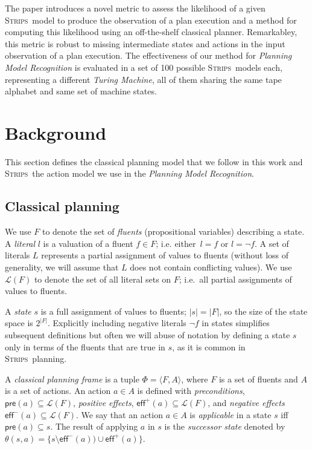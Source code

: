 \documentclass[letterpaper]{article} %
\newcommand{\tup}[1]{{\langle #1 \rangle}}
\newcommand{\pre}{\mathsf{pre}}     %
\newcommand{\eff}{\mathsf{eff}}     %
\newcommand{\strips}{\textsc{Strips}}     %
\begin{document}
The paper introduces a novel metric to assess the likelihood of a given \strips\ model to produce the observation of a plan execution and a method for computing this likelihood using an off-the-shelf classical planner. Remarkabley, this metric is robust to missing intermediate states and actions in the input observation of a plan execution. The effectiveness of our method for {\em Planning Model Recognition} is evaluated in a set of 100 possible \strips\ models each, representing a different {\em Turing Machine}, all of them sharing the same tape alphabet and same set of machine states.


\section{Background}
\label{sec:section2}
This section defines the classical planning model that we follow in this work and \strips\, the action model we use in the {\em Planning Model Recognition}.

\subsection{Classical planning}
We use $F$ to denote the set of {\em fluents} (propositional variables) describing a state. A {\em literal} $l$ is a valuation of a fluent $f\in F$; i.e. either~$l=f$ or $l=\neg f$. A set of literals $L$ represents a partial assignment of values to fluents (without loss of generality, we will assume that $L$ does not contain conflicting values). We use $\mathcal{L}(F)$ to denote the set of all literal sets on $F$; i.e.~all partial assignments of values to fluents.

A {\em state} $s$ is a full assignment of values to fluents; $|s|=|F|$, so the size of the state space is $2^{|F|}$. Explicitly including negative literals $\neg f$ in states simplifies subsequent definitions but often we will abuse of notation by defining a state $s$ only in terms of the fluents that are true in $s$, as it is common in \strips\ planning.

A {\em classical planning frame} is a tuple $\Phi=\tup{F,A}$, where $F$ is a set of fluents and $A$ is a set of actions. An action $a\in A$ is defined with {\em preconditions}, $\pre(a)\subseteq\mathcal{L}(F)$, {\em positive effects}, $\eff^+(a)\subseteq\mathcal{L}(F)$, and {\em negative effects} $\eff^-(a)\subseteq\mathcal{L}(F)$. We say that an action $a\in A$ is {\em applicable} in a state $s$ iff $\pre(a)\subseteq s$. The result of applying $a$ in $s$ is the {\em successor state} denoted by $\theta(s,a)=\{s\setminus\eff^-(a))\cup\eff^+(a)\}$.
\end{document}
